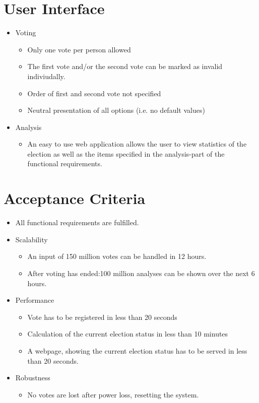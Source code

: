 \documentclass[10pt,a4paper]{article}
\begin{document}
	\section*{User Interface}
	
	\begin{itemize}
		\item Voting
			\begin{itemize}
				\item Only one vote per person allowed
				\item The first vote and/or the second vote can be marked as invalid indiviudally.
				\item Order of first and second vote not specified
				\item Neutral presentation of all options (i.e. no default values)
			\end{itemize}
		\item Analysis
			\begin{itemize}
				\item An easy to use web application allows the user to view statistics of the election as well as the items specified in the analysis-part of the functional requirements.
			\end{itemize}
	\end{itemize}
	
	\section*{Acceptance Criteria}
	\begin{itemize}
		\item All functional requirements are fulfilled.
		\item Scalability
			\begin{itemize}
				\item An input of 150 million votes can be handled in 12 hours.
				\item After voting has ended:100 million analyses can be shown over the next 6 hours. 
			\end{itemize} 
		\item Performance
			\begin{itemize}
				\item Vote has to be registered in less than 20 seconds
				\item Calculation of the current election status in less than 10 minutes
				\item A webpage, showing the current election status has to be served in less than 20 seconds.
			\end{itemize}
		\item Robustness
			\begin{itemize}
				\item No votes are lost after power loss, resetting the system.
			\end{itemize}
	\end{itemize}
\end{document}
